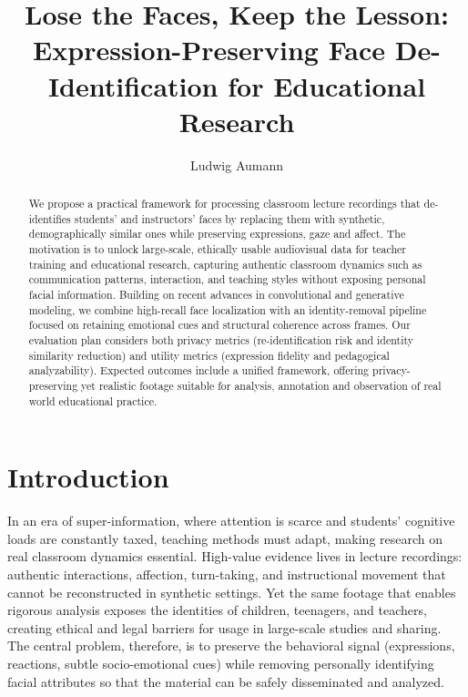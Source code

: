 \documentclass[12pt]{article}
\title{Lose the Faces, Keep the Lesson: Expression-Preserving Face De-Identification for Educational Research}
\author{Ludwig Aumann\inst{1} }
\begin{document}
 

\maketitle

\begin{abstract}
We propose a practical framework for processing classroom lecture recordings that de-identifies students’ and instructors’ faces by replacing them with synthetic, demographically similar ones while preserving expressions, gaze and affect. The motivation is to unlock large-scale, ethically usable audiovisual data for teacher training and educational research, capturing authentic classroom dynamics such as communication patterns, interaction, and teaching styles without exposing personal facial information. Building on recent advances in convolutional and generative modeling, we combine high-recall face localization with an identity-removal pipeline focused on retaining emotional cues and structural coherence across frames. Our evaluation plan considers both privacy metrics (re-identification risk and identity similarity reduction) and utility metrics (expression fidelity and pedagogical analyzability). Expected outcomes include a unified framework, offering privacy-preserving yet realistic footage suitable for analysis, annotation and observation of real world educational practice.

\end{abstract}

\section{Introduction} \label{sec:introduction}

In an era of super-information, where attention is scarce and students’ cognitive loads are constantly taxed, teaching methods must adapt, making research on real classroom dynamics essential. High-value evidence lives in lecture recordings: authentic interactions, affection, turn-taking, and instructional movement that cannot be reconstructed in synthetic settings. Yet the same footage that enables rigorous analysis exposes the identities of children, teenagers, and teachers, creating ethical and legal barriers for usage in large-scale studies and sharing. The central problem, therefore, is to preserve the behavioral signal (expressions, reactions, subtle socio-emotional cues) while removing personally identifying facial attributes so that the material can be safely disseminated and analyzed.
\end{document}
